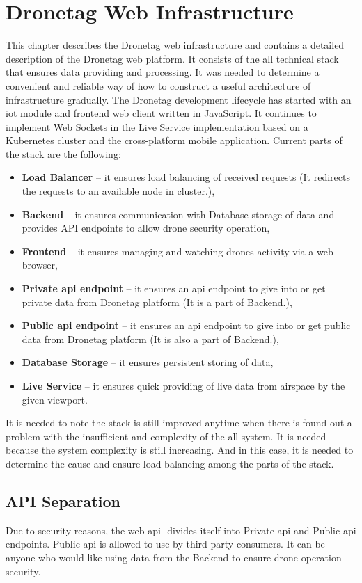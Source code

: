 \chapter{Dronetag Web Infrastructure}\label{ch:dronetag-web-infrastructure}
This chapter describes the Dronetag web infrastructure and contains a detailed description of the Dronetag web platform.
It consists of the all technical stack that ensures data providing and processing.
It was needed to determine a convenient and reliable way of how to construct a useful architecture of infrastructure gradually.
The Dronetag development lifecycle has started with an \acrshort{iot} module and frontend web client written in JavaScript.
It continues to implement Web Sockets in the Live Service implementation based on a Kubernetes cluster and the cross-platform mobile application.
Current parts of the stack are the following:
\begin{itemize}
    \item \textbf{Load Balancer} -- it ensures load balancing of received requests (It redirects the requests to an available node in cluster.),
    \item \textbf{Backend} -- it ensures communication with Database storage of data and provides API endpoints to allow drone security operation,
    \item \textbf{Frontend} -- it ensures managing and watching drones activity via a web browser,
    \item \textbf{Private \acrshort{api} endpoint} -- it ensures an \acrshort{api} endpoint to give into or get private data from Dronetag platform (It is a part of Backend.),
    \item \textbf{Public \acrshort{api} endpoint} -- it ensures an \acrshort{api} endpoint to give into or get public data from Dronetag platform (It is also a part of Backend.),
    \item \textbf{Database Storage} -- it ensures persistent storing of data,
    \item \textbf{Live Service} -- it ensures quick providing of live data from airspace by the given viewport.
\end{itemize}
\newpage
It is needed to note the stack is still improved anytime when there is found out a problem with the insufficient and complexity of the all system.
It is needed because the system complexity is still increasing.
And in this case, it is needed to determine the cause and ensure load balancing among the parts of the stack.

\section{API Separation}\label{sec:api-separation}
Due to security reasons, the web \acrshort{api}- divides itself into Private \acrshort{api} and Public \acrshort{api} endpoints.
Public \acrshort{api} is allowed to use by third-party consumers.
It can be anyone who would like using data from the Backend to ensure drone operation security.

